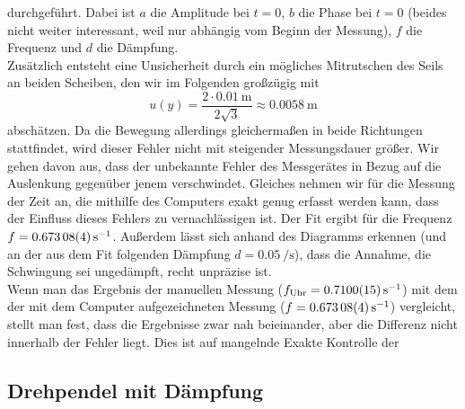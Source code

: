 \documentclass[
	a4paper,
	12pt,
	pagesize,
	ngerman
]{scrartcl}
\begin{document}
	durchgeführt. Dabei ist $a$ die Amplitude bei $t=0$, $b$ die Phase bei $t=0$  (beides nicht weiter interessant, weil nur abhängig vom Beginn der Messung), $f$ die Frequenz und $d$ die Dämpfung.\\
	Zusätzlich entsteht eine Unsicherheit durch ein mögliches Mitrutschen des Seils an beiden Scheiben, den wir im Folgenden großzügig mit 
	\begin{equation*}
		u(y) = \frac{2 \cdot \SI{0,01}{\meter}}{2 \sqrt{3}} \approx \SI{0,0058}{\meter}
	\end{equation*}
	abschätzen. Da die Bewegung allerdings gleichermaßen in beide Richtungen stattfindet, wird dieser Fehler nicht mit steigender Messungsdauer größer.
	Wir gehen davon aus, dass der unbekannte Fehler des Messgerätes in Bezug auf die Auslenkung gegenüber jenem verschwindet. Gleiches nehmen wir für die Messung der Zeit an, die mithilfe des Computers exakt genug erfasst werden kann, dass der Einfluss dieses Fehlers zu vernachlässigen ist.
	Der Fit ergibt für die Frequenz $ f = \SI{0,67308 \pm 0,00004}{\per \second} $.
	Außerdem lässt sich anhand des Diagramms erkennen (und an der aus dem Fit folgenden Dämpfung $ d= \SI{0,05}{\per \second} $), dass die Annahme, die Schwingung sei ungedämpft, recht unpräzise ist. \\
	Wenn man das Ergebnis der manuellen Messung ($f_\text{Uhr} = \SI{0,71 \pm 0,0015}{\per \second}$) mit dem der mit dem Computer aufgezeichneten Messung ($ f = \SI{0,67308 \pm 0,00004}{\per \second} $) vergleicht, stellt man fest, dass die Ergebnisse zwar nah beieinander, aber die Differenz nicht innerhalb der Fehler liegt.
	Dies ist auf mangelnde Exakte Kontrolle der 
	
	\subsection{Drehpendel mit Dämpfung}
	
\end{document}
